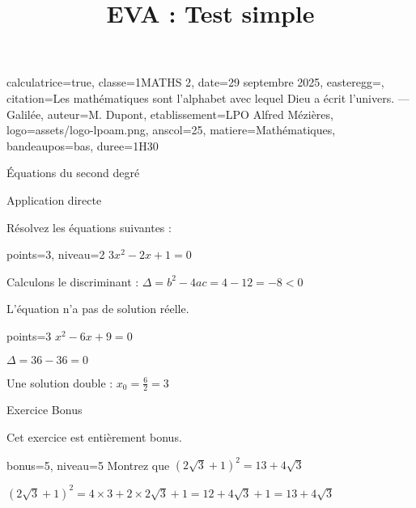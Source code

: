 \documentclass[correctionfin,theme=vert]{nfdevoirs}
\title{EVA : Test simple}
\begin{document}
\begin{devoir}{
        calculatrice=true,
        classe={1MATHS 2},
        date={29 septembre 2025},
        easteregg={},
        citation={Les mathématiques sont l'alphabet avec lequel Dieu a écrit l'univers. --- Galilée},
        auteur={M. Dupont},
        etablissement={LPO Alfred Mézières},
        logo={assets/logo-lpoam.png},
        anscol=25,
        matiere={Mathématiques},
        bandeaupos={bas},
        duree={1H30}
    }

    \begin{partie}{Équations du second degré}

        \begin{exercice}{Application directe}

            Résolvez les équations suivantes :

            \begin{question}{points=3, niveau=2}
                $3x^2 - 2x + 1 = 0$
            \end{question}

            \begin{correction}
                Calculons le discriminant : $\Delta = b^2 - 4ac = 4 - 12 = -8 < 0$

                L'équation n'a pas de solution réelle.
            \end{correction}

            \begin{question}{points=3}
                $x^2 - 6x + 9 = 0$
            \end{question}

            \begin{correction}
                $\Delta = 36 - 36 = 0$

                Une solution double : $x_0 = \frac{6}{2} = 3$
            \end{correction}

        \end{exercice}

        \begin{exercice}{Exercice Bonus}

            Cet exercice est entièrement bonus.

            \begin{question}{bonus=5, niveau=5}
                Montrez que $(2\sqrt{3} + 1)^2 = 13 + 4\sqrt{3}$
            \end{question}

            \begin{correction}
                $(2\sqrt{3} + 1)^2 = 4 \times 3 + 2 \times 2\sqrt{3} + 1 = 12 + 4\sqrt{3} + 1 = 13 + 4\sqrt{3}$
            \end{correction}

        \end{exercice}

    \end{partie}

\end{devoir}
\end{document}
